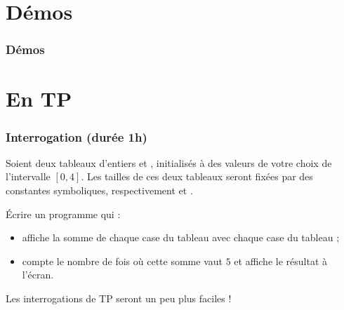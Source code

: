\documentclass[xcolor=pdftex,svgnames,table]{beamer}
\begin{document}






\section{Démos}
\begin{frame}
  \frametitle{Démos}
\end{frame}


\section{En TP}
\begin{frame}
  \frametitle{Interrogation (durée 1h)}
  
Soient deux tableaux d'entiers  et , initialisés à des valeurs de votre choix de l'intervalle $[0,4]$. Les tailles de ces deux tableaux seront fixées par des constantes symboliques, respectivement  et . 

Écrire un programme qui :
\begin{itemize}
\item affiche la somme de chaque case du tableau  avec chaque
  case du tableau ; 
\item compte le nombre de fois où cette somme vaut $5$ et affiche le résultat à l'écran.
\end{itemize} 

\pause
\alert{Les interrogations de TP seront un peu plus faciles !}

\end{frame}
\end{document}
